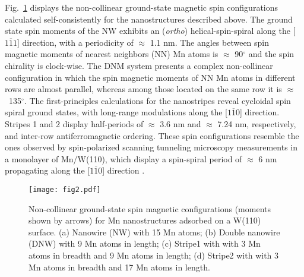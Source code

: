 \documentclass[prl,final,twocolumn]{revtex4-1}
\begin{document}
% 
Fig.~\ref{fig:spin-conf} displays the non-collinear ground-state magnetic spin configurations calculated self-consistently for the nanostructures described above.
The ground state spin moments of the NW 
% 
exhibits an ({\it ortho}) helical-spin-spiral along the [$1\overline{1}1$] direction, with a periodicity of $\approx$ 1.1 nm. The angles between spin magnetic moments of nearest neighbors (NN) Mn atoms is $\approx$ 90$^{\circ}$ and the spin chirality is clock-wise.
% 
The DNM system presents a complex non-collinear configuration in which the spin magnetic moments of NN Mn atoms in different rows are almost parallel, whereas among those located on the same row it is $\approx$~135$^{\circ}$. 
% 
The first-principles calculations for the nanostripes reveal cycloidal spin spiral ground states, with long-range modulations along the [$1\overline{1}0$] direction. Stripes 1 and 2 display half-periods of $\approx$ 3.6 nm and $\approx$ 7.24 nm, respectively, and inter-row antiferromagnetic ordering. These spin configurations resemble the ones observed by spin-polarized scanning tunneling microscopy measurements in a monolayer of Mn/W(110), which display a spin-spiral period of $\approx$ 6 nm propagating along the [$1\overline{1}0$] direction \cite{bode2007chiral}.
% 


\begin{figure}[htp]
\centering
\texttt{[image: fig2.pdf]}
\caption{
Non-collinear ground-state spin magnetic configurations (moments shown by arrows) for Mn nanostructures adsorbed on a W(110) surface. (a) Nanowire (NW) with 15 Mn atoms; (b) Double nanowire (DNW) with 9 Mn atoms in length; (c) Stripe1 with with 3 Mn atoms in breadth and 9 Mn atoms in length; (d) Stripe2 with with 3 Mn atoms in breadth and 17 Mn atoms in length.
}
\label{fig:spin-conf}
\end{figure}
% 
\end{document}
